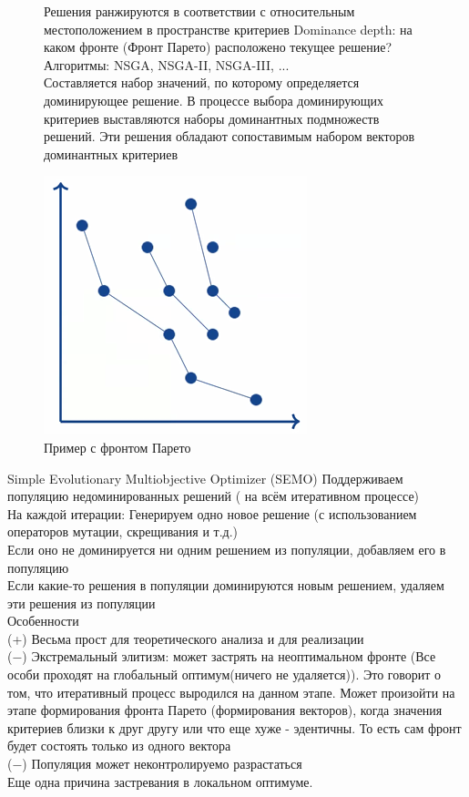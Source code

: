 \begin{figure}[!ht]
Решения ранжируются в соответствии с относительным местоположением в
пространстве критериев
Dominance depth: на каком фронте (Фронт Парето) расположено текущее решение?
Алгоритмы: NSGA, NSGA-II, NSGA-III, ...\\

Составляется набор значений, по которому определяется доминирующее решение. В процессе выбора доминирующих критериев выставляются наборы доминантных подмножеств решений. Эти решения обладают сопоставимым набором векторов доминантных критериев
\begin{center}
    \includegraphics[width=0.8\linewidth]{images/Dominate_3.PNG}
    \caption{Пример с фронтом Парето}
    \label{fig:mpr}
\end{center}
\end{figure}

\newpage
Simple Evolutionary Multiobjective Optimizer (SEMO)
Поддерживаем популяцию недоминированных решений ( на всём итеративном процессе)\\
На каждой итерации:
Генерируем одно новое решение (с использованием операторов
мутации, скрещивания и т.д.)\\
Если оно не доминируется ни одним решением из популяции,
добавляем его в популяцию\\
Если какие-то решения в популяции доминируются новым решением,
удаляем эти решения из популяции\\
Особенности\\
(+) Весьма прост для теоретического анализа и для реализации\\
(−) Экстремальный элитизм: может застрять на неоптимальном фронте (Все особи проходят на глобальный оптимум(ничего не удаляется)). Это говорит о том, что итеративный процесс выродился на данном этапе. Может произойти на этапе формирования фронта Парето (формирования векторов), когда значения критериев близки к друг другу или что еще хуже - эдентичны. То есть сам фронт будет состоять только из одного вектора\\
(−) Популяция может неконтролируемо разрастаться\\
Еще одна причина застревания в локальном оптимуме.
